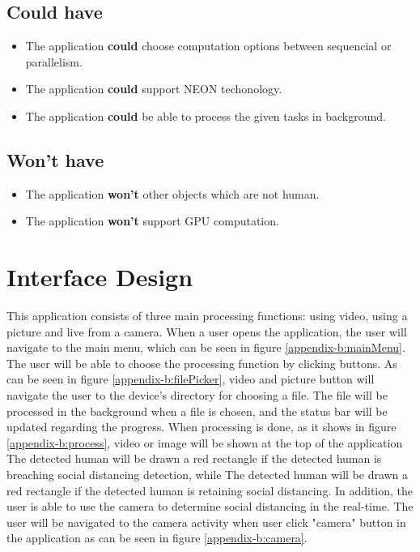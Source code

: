         \subsection{Could have}
            \begin{itemize}
                \item The application \textbf{could} choose computation options between sequencial or parallelism.
                \item The application \textbf{could} support NEON techonology.
                \item The application \textbf{could} be able to process the given tasks in background.
            \end{itemize}
        \subsection{Won't have}
            \begin{itemize}
                \item The application \textbf{won't} other objects which are not human.
                \item The application \textbf{won't} support GPU computation.
            \end{itemize}

    \section{Interface Design}
        This application consists of three main processing functions: using video, using a picture and live from a camera.
        When a user opens the application, the user will navigate to the main menu, which can be seen in figure \ref{appendix-b:mainMenu}.
        The user will be able to choose the processing function by clicking buttons.
        As can be seen in figure \ref{appendix-b:filePicker}, video and picture button will navigate the user to the device's directory for choosing a file.
        The file will be processed in the background when a file is chosen, and the status bar will be updated regarding the progress.
        When processing is done, as it shows in figure \ref{appendix-b:process}, video or image will be shown at the top of the application
        The detected human will be drawn a red rectangle if the detected human is breaching social distancing detection,
        while The detected human will be drawn a red rectangle if the detected human is retaining social distancing.
        In addition, the user is able to use the camera to determine social distancing in the real-time.
        The user will be navigated to the camera activity when user click "camera" button in the application as can be seen in figure \ref{appendix-b:camera}.

